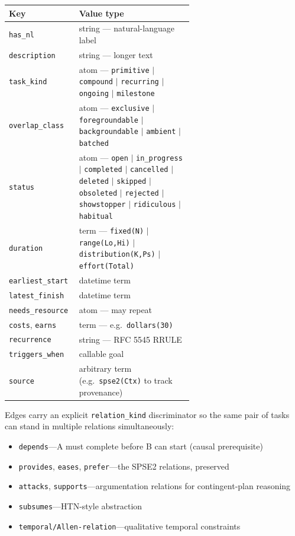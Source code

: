 \documentclass[11pt,letterpaper]{article}
\begin{document}
\begin{center}
\small
\begin{tabular}{@{}lp{0.62\linewidth}@{}}
\toprule
Key & Value type \\
\midrule
\texttt{has\_nl}         & string --- natural-language label \\
\texttt{description}     & string --- longer text \\
\texttt{task\_kind}      & atom --- \texttt{primitive} $\vert$ \texttt{compound} $\vert$ \texttt{recurring} $\vert$ \texttt{ongoing} $\vert$ \texttt{milestone} \\
\texttt{overlap\_class}  & atom --- \texttt{exclusive} $\vert$ \texttt{foregroundable} $\vert$ \texttt{backgroundable} $\vert$ \texttt{ambient} $\vert$ \texttt{batched} \\
\texttt{status}          & atom --- \texttt{open} $\vert$ \texttt{in\_progress} $\vert$ \texttt{completed} $\vert$ \texttt{cancelled} $\vert$ \texttt{deleted} $\vert$ \texttt{skipped} $\vert$ \texttt{obsoleted} $\vert$ \texttt{rejected} $\vert$ \texttt{showstopper} $\vert$ \texttt{ridiculous} $\vert$ \texttt{habitual} \\
\texttt{duration}        & term --- \texttt{fixed(N)} $\vert$ \texttt{range(Lo,Hi)} $\vert$ \texttt{distribution(K,Ps)} $\vert$ \texttt{effort(Total)} \\
\texttt{earliest\_start} & datetime term \\
\texttt{latest\_finish}  & datetime term \\
\texttt{needs\_resource} & atom --- may repeat \\
\texttt{costs}, \texttt{earns} & term --- e.g.\ \texttt{dollars(30)} \\
\texttt{recurrence}      & string --- RFC 5545 RRULE \\
\texttt{triggers\_when}  & callable goal \\
\texttt{source}          & arbitrary term (e.g.\ \texttt{spse2(Ctx)} to track provenance) \\
\bottomrule
\end{tabular}
\end{center}

Edges carry an explicit \texttt{relation\_kind} discriminator so the same
pair of tasks can stand in multiple relations simultaneously:

\begin{itemize}
\item \texttt{depends}---A must complete before B can start (causal prerequisite)
\item \texttt{provides}, \texttt{eases}, \texttt{prefer}---the SPSE2 relations, preserved
\item \texttt{attacks}, \texttt{supports}---argumentation relations for contingent-plan reasoning
\item \texttt{subsumes}---HTN-style abstraction
\item \texttt{temporal/Allen-relation}---qualitative temporal constraints
\end{itemize}
\end{document}
